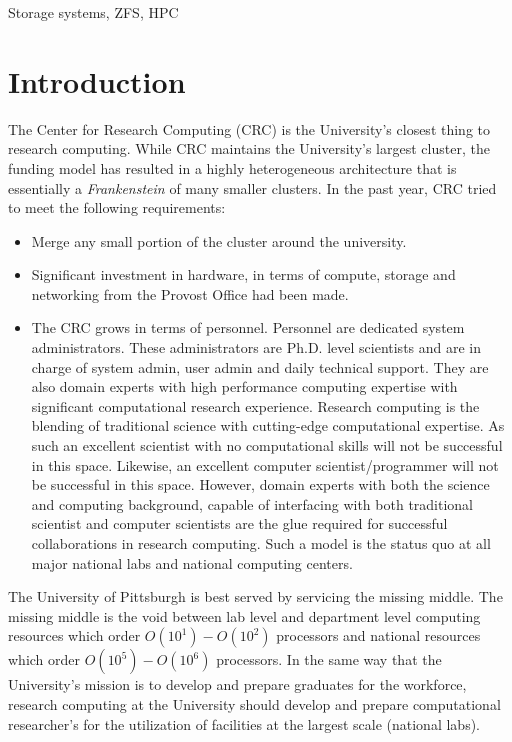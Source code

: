 \documentclass[conference]{IEEEtran}
\begin{document}
\begin{IEEEkeywords}
Storage systems, ZFS, HPC
\end{IEEEkeywords}



\section{Introduction}


The Center for Research Computing (CRC) is the University's closest thing to research computing.
While CRC maintains the University's largest cluster, the
funding model has resulted in a highly heterogeneous architecture that is essentially a {\it Frankenstein} of
many smaller clusters. In the past year, CRC tried to meet the following requirements:

\begin{itemize}

\item Merge any small portion of the cluster around the university. 

\item Significant investment in hardware, in terms of compute, storage and networking from the Provost Office had been made. 

\item The CRC grows in terms of personnel. Personnel are dedicated system administrators. These administrators are Ph.D. level scientists and are in charge of system admin, user admin and daily
technical support. They are also domain experts with high performance computing expertise with significant computational research experience. Research computing is the blending of traditional science with cutting-edge computational expertise. As such an excellent scientist with no computational skills will not
be successful in this space. Likewise, an excellent computer scientist/programmer will not be successful in this space. However, domain experts with both the science and computing background,
capable of interfacing with both traditional scientist and computer scientists are the glue required
for successful collaborations in research computing. Such a model is the status quo at all major
national labs and national computing centers.

\end{itemize}


The University of Pittsburgh is best served by servicing the missing middle. The missing middle is the void
between lab level and department level computing resources which order $O(10^1)-O(10^2)$ processors and national resources which order $O(10^5)-O(10^6)$ processors. In the same way that the
University's mission is to develop and prepare graduates for the workforce, research computing
at the University should develop and prepare computational researcher's for the utilization of
facilities at the largest scale (national labs).
\end{document}
